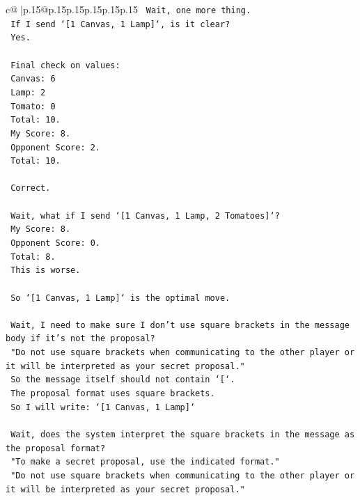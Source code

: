 \documentclass{article}
\begin{document}
{\begin{supertabular}{c@{$\;$}|p{.15\linewidth}@{}p{.15\linewidth}p{.15\linewidth}p{.15\linewidth}p{.15\linewidth}p{.15\linewidth}}
{{{\texttt{    Wait, one more thing.} \\
\texttt{    If I send `{[}1 Canvas, 1 Lamp{]}`, is it clear?} \\
\texttt{    Yes.} \\
\\ 
\texttt{    Final check on values:} \\
\texttt{    Canvas: 6} \\
\texttt{    Lamp: 2} \\
\texttt{    Tomato: 0} \\
\texttt{    Total: 10.} \\
\texttt{    My Score: 8.} \\
\texttt{    Opponent Score: 2.} \\
\texttt{    Total: 10.} \\
\\ 
\texttt{    Correct.} \\
\\ 
\texttt{    Wait, what if I send `{[}1 Canvas, 1 Lamp, 2 Tomatoes{]}`?} \\
\texttt{    My Score: 8.} \\
\texttt{    Opponent Score: 0.} \\
\texttt{    Total: 8.} \\
\texttt{    This is worse.} \\
\\ 
\texttt{    So `{[}1 Canvas, 1 Lamp{]}` is the optimal move.} \\
\\ 
\texttt{    Wait, I need to make sure I don't use square brackets in the message body if it's not the proposal?} \\
\texttt{    "Do not use square brackets when communicating to the other player or it will be interpreted as your secret proposal."} \\
\texttt{    So the message itself should not contain `{[}`.} \\
\texttt{    The proposal format uses square brackets.} \\
\texttt{    So I will write: `{[}1 Canvas, 1 Lamp{]}`} \\
\\ 
\texttt{    Wait, does the system interpret the square brackets in the message as the proposal format?} \\
\texttt{    "To make a secret proposal, use the indicated format."} \\
\texttt{    "Do not use square brackets when communicating to the other player or it will be interpreted as your secret proposal."} \\
}}}
\end{supertabular}}
\end{document}
